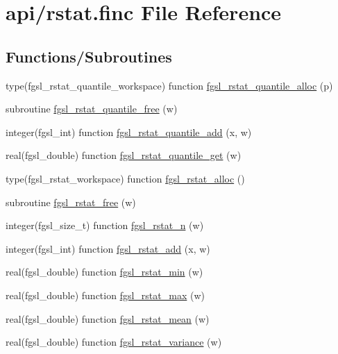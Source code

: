 \hypertarget{rstat_8finc}{}\section{api/rstat.finc File Reference}
\label{rstat_8finc}
\subsection*{Functions/\+Subroutines}
\begin{DoxyCompactItemize}
\item 
type(fgsl\+\_\+rstat\+\_\+quantile\+\_\+workspace) function \hyperlink{rstat_8finc_a2b8c1fcda0b00849a59f788dce723a5a}{fgsl\+\_\+rstat\+\_\+quantile\+\_\+alloc} (p)
\item 
subroutine \hyperlink{rstat_8finc_a92d88949f5df8501591890b2bfe5e8dd}{fgsl\+\_\+rstat\+\_\+quantile\+\_\+free} (w)
\item 
integer(fgsl\+\_\+int) function \hyperlink{rstat_8finc_affd7f82f6c1858aa1455caa64e3f2319}{fgsl\+\_\+rstat\+\_\+quantile\+\_\+add} (x, w)
\item 
real(fgsl\+\_\+double) function \hyperlink{rstat_8finc_a2d6ee5454a7d9e9872d16dc9cf2924c6}{fgsl\+\_\+rstat\+\_\+quantile\+\_\+get} (w)
\item 
type(fgsl\+\_\+rstat\+\_\+workspace) function \hyperlink{rstat_8finc_a56656d8f051a85186abbe995aef96d85}{fgsl\+\_\+rstat\+\_\+alloc} ()
\item 
subroutine \hyperlink{rstat_8finc_a46a0120e7a0b69973091d40c744ce346}{fgsl\+\_\+rstat\+\_\+free} (w)
\item 
integer(fgsl\+\_\+size\+\_\+t) function \hyperlink{rstat_8finc_a5ab9cd017b1c90b3222cfc825260078e}{fgsl\+\_\+rstat\+\_\+n} (w)
\item 
integer(fgsl\+\_\+int) function \hyperlink{rstat_8finc_a5ef21fb14b773100ecee633350c3f32e}{fgsl\+\_\+rstat\+\_\+add} (x, w)
\item 
real(fgsl\+\_\+double) function \hyperlink{rstat_8finc_a9a718fcf68bc88f1d757aec958c04b22}{fgsl\+\_\+rstat\+\_\+min} (w)
\item 
real(fgsl\+\_\+double) function \hyperlink{rstat_8finc_afbd84b532b9bbf00362c3cd7fdd390c8}{fgsl\+\_\+rstat\+\_\+max} (w)
\item 
real(fgsl\+\_\+double) function \hyperlink{rstat_8finc_a9eadf9053210e8dbc1663fe87ee3f651}{fgsl\+\_\+rstat\+\_\+mean} (w)
\item 
real(fgsl\+\_\+double) function \hyperlink{rstat_8finc_acd9939bb8666c1ec36de5978b09ca175}{fgsl\+\_\+rstat\+\_\+variance} (w)

\end{DoxyCompactItemize}
